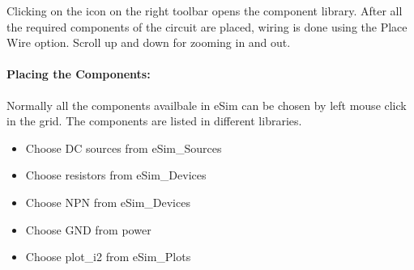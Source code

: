  Clicking on the icon on the right toolbar opens the component library. After all the required components of the circuit are placed, wiring is
done using the Place Wire option. %
 Scroll up and down for zooming in and out.




\paragraph{Placing the Components:} Normally all the components availbale in eSim can be chosen by left mouse click in the grid. The components are listed in different libraries. %


\begin{itemize}
\item
Choose DC sources from eSim\_Sources
\item
Choose resistors from eSim\_Devices
\item
Choose NPN from eSim\_Devices
\item
Choose GND from power
\item
Choose plot\_i2  from eSim\_Plots
\end{itemize}



